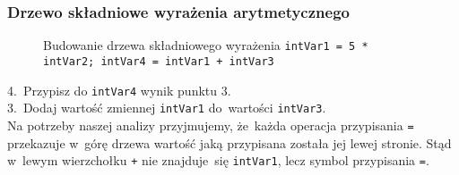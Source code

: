 \documentclass[10pt,t]{beamer}
\begin{document}
\begin{frame}
  \frametitle{Drzewo składniowe wyrażenia arytmetycznego}


  \begin{figure}


    \caption{Budowanie drzewa składniowego wyrażenia
      \texttt{intVar1 = 5 * intVar2; intVar4 = intVar1 + intVar3}}

    \label{fig:Scheme-of-CPU}

  \end{figure}





  4.~Przypisz do \texttt{intVar4} wynik punktu 3. \\
  3.~Dodaj wartość zmiennej \texttt{intVar1} do~wartości
  \texttt{intVar3}. \\
  Na potrzeby naszej analizy przyjmujemy, że~każda operacja przypisania
  \texttt{=} przekazuje w~górę drzewa wartość jaką przypisana została jej
  lewej stronie. Stąd w~lewym wierzchołku \texttt{+} nie znajduje~się
  \texttt{intVar1}, lecz symbol przypisania \texttt{=}.

\end{frame}
\end{document}
